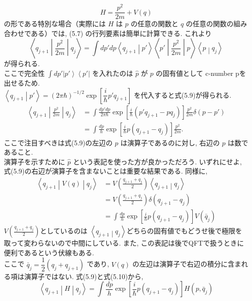 \documentclass{jsarticle}
\newcommand{\bra}[1]{\left\langle #1\right|}
\newcommand{\ket}[1]{\left|#1\right\rangle}
\newcommand{\braket}[2]{\left\langle #1\middle|#2\right\rangle}
\newcommand{\brakets}[3]{\left\langle #1\middle| #2 \middle|#3 \right\rangle}
\begin{document}
\begin{equation*}
    H = \frac{p^2}{2m} + V(q) \tag{5.8}
\end{equation*}
の形である特別な場合（実際には $H$ は $p$ の任意の関数と $q$ の任意の関数の組み合わせである）では, (5.7) の行列要素は簡単に計算できる. これより
\begin{equation*}
    \brakets{q_{j+1}}{\frac{p^2}{2m}}{q_{j}} = \int dp' dp \braket{q_{j+1}}{p'}\brakets{p'}{\frac{p^2}{2m}}{p}\braket{p}{q_j}
\end{equation*}
が得られる.\\
\color{blue}
ここで完全性 $\displaystyle \int dp' \ket{p'}\bra{p'}$ を入れたのは $\hat{p}$ が $p$ の固有値として c-number pを出せるため.\\
\color{black}
 $\braket{q_{j+1}}{p'} = (2\pi\hbar)^{-1/2}\exp\left[ \dfrac{i}{\hbar}p'q_{j+1} \right]$ を代入すると式(5.9)が得られる.
\begin{align*}
    \brakets{q_{j+1}}{\frac{p^2}{2m}}{q_j} &= \int \frac{dp' dp}{2\pi\hbar}\exp\left[ \frac{i}{\hbar}(p' q_{j+1} - pq_{j}) \right]\frac{p^2}{2m}\delta(p - p')\\
    &= \int \frac{dp}{h}\exp\left[ \frac{i}{\hbar}p(q_{j+1} - q_{j}) \right]\frac{p^2}{2m}. \tag{5.9}
\end{align*}
ここで注目すべきは式(5.9)の左辺の $p$ は演算子であるのに対し, 右辺の $p$ は数であること. \\
演算子を示すために $\hat{p}$ という表記を使った方が良かっただろう. いずれにせよ, 式(5.9)の右辺が演算子を含まないことは重要な結果である. 同様に,
\begin{align*}
    \brakets{q_{j+1}}{V(q)}{q_j} &= V\left( \frac{q_{j+1} + q_{j}}{2} \right)\braket{q_{j+1}}{q_{j}}\\
    &= V\left( \frac{q_{j+1} + q_{j}}{2} \right)\delta(q_{j+1} - q_{j})\\
    &= \int \frac{dp}{h}\exp\left[ \frac{i}{\hbar}p(q_{j+1} - q_{j}) \right]V(\bar{q}_{j}) \tag{5.10}
\end{align*}
\color{blue}
$\displaystyle V\left( \frac{q_{j+1} + q_j}{2} \right)$としているのは $\braket{q_{j+1}}{q_j}$どちらの固有値でもどうせ後で極限を取って変わらないので中間にしている. また, この表記は後でQFTで扱うときに便利であるという伏線もある.\\
\color{black}
ここで $\bar{q}_{j} = \dfrac{1}{2}(q_{j} + q_{j+1})$ であり, $V(q)$ の左辺は演算子で右辺の積分に含まれる項は演算子ではない. 式(5.9)と式(5.10)から,
\begin{equation*}
    \brakets{q_{j+1}}{H}{q_{j}} = \int \frac{dp}{h} \exp\left[ \frac{i}{\hbar}p(q_{j+1} - q_{j}) \right] H(p, \bar{q}_{j})
\end{equation*}
\end{document}
